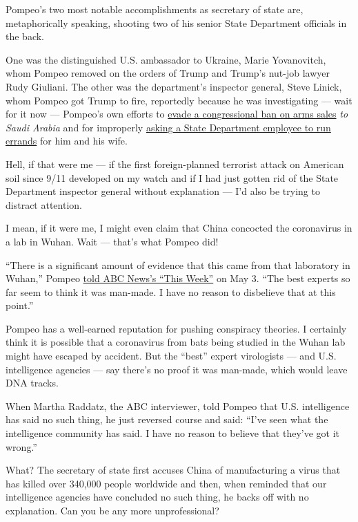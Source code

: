 Pompeo's two most notable accomplishments as secretary of state are,
metaphorically speaking, shooting two of his senior State Department
officials in the back.

One was the distinguished U.S. ambassador to Ukraine, Marie Yovanovitch,
whom Pompeo removed on the orders of Trump and Trump's nut-job lawyer
Rudy Giuliani. The other was the department's inspector general, Steve
Linick, whom Pompeo got Trump to fire, reportedly because he was
investigating --- wait for it now --- Pompeo's own efforts to
\href{https://www.nytimes.com/2020/05/16/us/arms-deals-raytheon-yemen.html}{evade
a congressional ban on arms sales} \emph{to Saudi Arabia} and for
improperly
\href{https://www.cnn.com/2019/07/01/politics/pompeo-democrats-whistleblower-claims/index.html}{asking
a State Department employee to run errands} for him and his wife.

Hell, if that were me --- if the first foreign-planned terrorist attack
on American soil since 9/11 developed on my watch and if I had just
gotten rid of the State Department inspector general without explanation
--- I'd also be trying to distract attention.

I mean, if it were me, I might even claim that China concocted the
coronavirus in a lab in Wuhan. Wait --- that's what Pompeo did!

``There is a significant amount of evidence that this came from that
laboratory in Wuhan,'' Pompeo
\href{https://www.state.gov/secretary-michael-r-pompeo-with-martha-raddatz-of-abcs-this-week-with-george-stephanopoulos/}{told
ABC News's ``This Week''} on May 3. ``The best experts so far seem to
think it was man-made. I have no reason to disbelieve that at this
point.''

Pompeo has a well-earned reputation for pushing conspiracy theories. I
certainly think it is possible that a coronavirus from bats being
studied in the Wuhan lab might have escaped by accident. But the
``best'' expert virologists --- and U.S. intelligence agencies --- say
there's no proof it was man-made, which would leave DNA tracks.

When Martha Raddatz, the ABC interviewer, told Pompeo that U.S.
intelligence has said no such thing, he just reversed course and said:
``I've seen what the intelligence community has said. I have no reason
to believe that they've got it wrong.''

What? The secretary of state first accuses China of manufacturing a
virus that has killed over 340,000 people worldwide and then, when
reminded that our intelligence agencies have concluded no such thing, he
backs off with no explanation. Can you be any more unprofessional?

